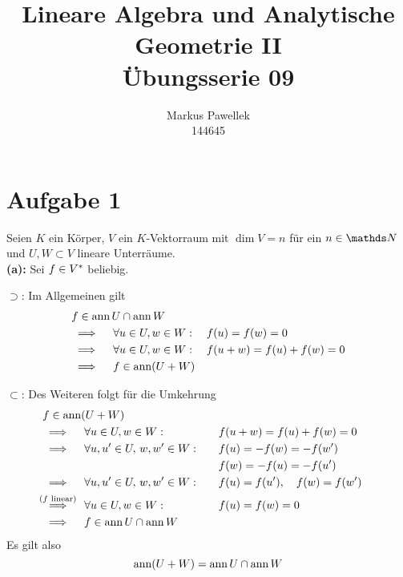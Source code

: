 

\title{Lineare Algebra und Analytische Geometrie II \\ Übungsserie 09}
\author{Markus Pawellek \\ 144645}
\newcommand{\email}{markuspawellek@gmail.com}



	
	\articletitle

	\section*{Aufgabe 1}
	
		Seien $K$ ein Körper, $V$ ein $K$-Vektorraum mit $\dim V = n$ für ein $n\in\SN$ und $U,W\subset V$ lineare Unterräume.\\

		\textbf{(a):}
		Sei $f\in{V}^*$ beliebig.

		\glqq$\supset$\grqq:
		Im Allgemeinen gilt
		\begin{alignat*}{3}
			&f\in \operatorname{ann} U \cap \operatorname{ann} W \\
			&\implies \quad \forall u\in U,w\in W: \quad f(u) = f(w) = 0 \\
			&\implies \quad \forall u\in U,w\in W: \quad f(u+w) = f(u) + f(w) = 0 \\
			&\implies \quad f\in \operatorname{ann}(U+W)
		\end{alignat*}

		\glqq$\subset$\grqq:
		Des Weiteren folgt für die Umkehrung
		\begin{alignat*}{3}
			& f\in \ann(U+W) \\
			&\implies \quad \forall u\in U,w\in W: \quad &&f(u+w) = f(u) + f(w) = 0 \\
			&\implies \quad \forall u,u^\prime\in U,\,w,w^\prime\in W: \quad &&f(u) = -f(w) = -f(w^\prime) \\
				& && f(w) = -f(u) = -f(u^\prime) \\
			&\implies \quad \forall u,u^\prime\in U,\,w,w^\prime\in W: \quad &&f(u) = f(u^\prime),\quad f(w)=f(w^\prime) \\
			&\stackrel{\mathclap{(f \text{ linear})}}{\implies} \quad \forall u\in U,w\in W: \quad &&f(u) = f(w) = 0 \\
			&\implies \quad f\in \ann U \cap \ann W
		\end{alignat*}
		Es gilt also
		\[
			\operatorname{ann}(U+W) = \operatorname{ann} U \cap \operatorname{ann} W
		\]
		\qedbox

